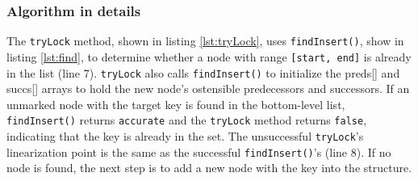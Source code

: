 \vspace{15pt}


\begin{figure}[!p]
    \centering
    
\end{figure}

\subsubsection*{Algorithm in details}
The \texttt{tryLock} method, shown in listing \ref{lst:tryLock}, uses \texttt{findInsert()}, show in listing \ref{lst:find}, to determine whether a node with range \texttt{[start, end]} is already in the list (line 7). \texttt{tryLock} also calls \texttt{findInsert()} to initialize the preds[] and succs[] arrays to hold the new node's ostensible predecessors and successors.
If an unmarked node with the target key is found in the bottom-level list, \texttt{findInsert()} returns \texttt{accurate} and the \texttt{tryLock} method returns \texttt{false}, indicating that the key is already in the set. The unsuccessful \texttt{tryLock}'s linearization point is the same as the successful \texttt{findInsert()}'s (line 8). If no node is found, the next step is to add a new node with the key into the structure.

